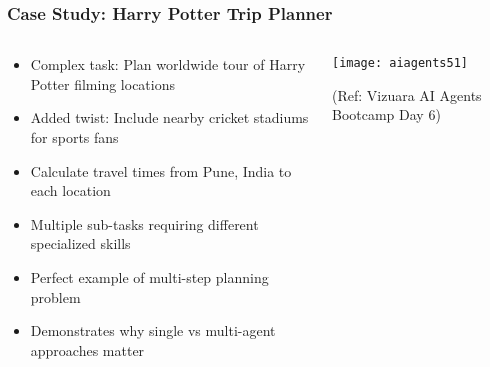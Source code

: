 \begin{frame}[fragile]\frametitle{Case Study: Harry Potter Trip Planner}
\begin{columns}
    \begin{column}[T]{0.6\linewidth}
      \begin{itemize}
		\item Complex task: Plan worldwide tour of Harry Potter filming locations
		\item Added twist: Include nearby cricket stadiums for sports fans
		\item Calculate travel times from Pune, India to each location
		\item Multiple sub-tasks requiring different specialized skills
		\item Perfect example of multi-step planning problem
		\item Demonstrates why single vs multi-agent approaches matter
	  \end{itemize}
    \end{column}
    \begin{column}[T]{0.4\linewidth}
		\begin{center}
		\texttt{[image: aiagents51]}
		
		{\tiny (Ref: Vizuara AI Agents Bootcamp Day 6)}
		\end{center}	
    \end{column}
  \end{columns}
\end{frame}

